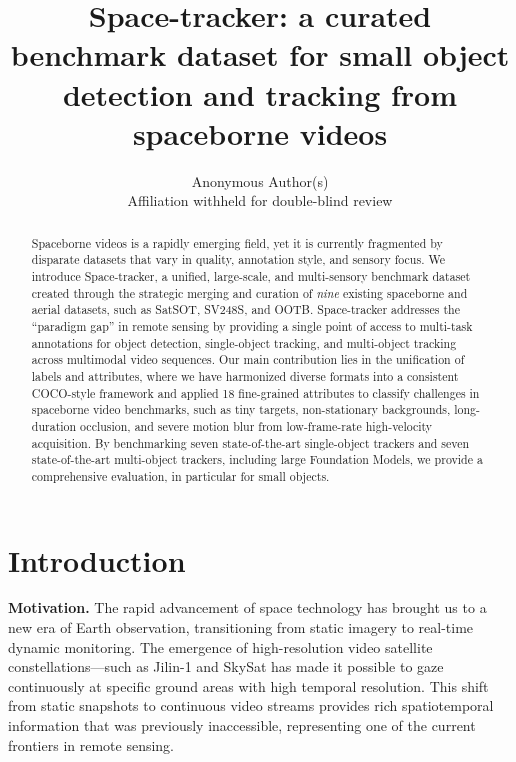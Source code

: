 \documentclass{article}
\title{Space-tracker: a curated benchmark dataset for small object detection and tracking from spaceborne videos}
\author{%
Anonymous Author(s) \\ Affiliation withheld for double-blind review \\ }
\begin{document}
\maketitle


\begin{abstract}
Spaceborne videos is a rapidly emerging field, yet it is
currently fragmented by disparate datasets that vary in quality, annotation
style, and sensory focus. We introduce Space-tracker, a unified, large-scale,
and multi-sensory benchmark dataset created through the strategic merging and
curation of \textit{nine} existing spaceborne and aerial datasets, such as SatSOT,
SV248S, and OOTB. Space-tracker addresses the ``paradigm gap'' in remote sensing
by providing a single point of access to multi-task annotations for object detection, single-object tracking, and multi-object tracking across multimodal video sequences. Our main contribution lies in the unification of labels and attributes, where we have harmonized diverse formats into a consistent COCO-style framework and applied 18 fine-grained attributes to classify challenges in spaceborne video benchmarks, such as tiny targets,
non-stationary backgrounds, long-duration
occlusion, and severe motion blur from low-frame-rate high-velocity acquisition. By benchmarking seven state-of-the-art single-object trackers and seven state-of-the-art multi-object trackers, including large Foundation Models, we provide a comprehensive evaluation, in particular for small objects.
\end{abstract}


\section{Introduction}
\label{sec:introduction}
\noindent\textbf{Motivation.}
The rapid advancement of space technology has brought us to a new era of Earth
observation, transitioning from static imagery to real-time dynamic monitoring.
The emergence of high-resolution video satellite constellations—such as Jilin-1 and SkySat has made it possible to gaze continuously at specific ground areas with high temporal resolution. This shift from static snapshots to continuous video streams provides rich spatiotemporal information that was previously inaccessible, representing one of the current frontiers in remote sensing.
\end{document}
